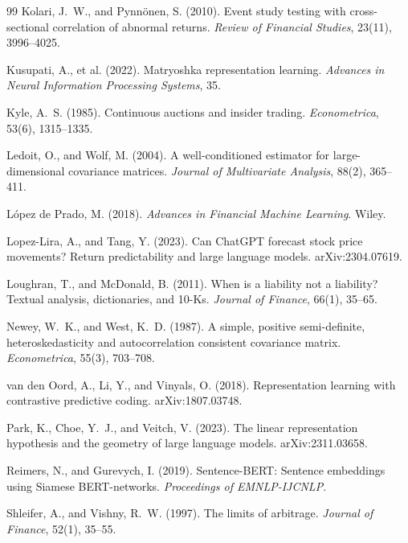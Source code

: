 \documentclass[11pt,a4paper]{article}
\theoremstyle{plain}
\theoremstyle{definition}
\begin{document}
\begin{thebibliography}{99}
Kolari, J.~W., and Pynn\"onen, S. (2010). Event study testing with cross-sectional correlation of abnormal returns. \emph{Review of Financial Studies}, 23(11), 3996--4025.

Kusupati, A., et al. (2022). Matryoshka representation learning. \emph{Advances in Neural Information Processing Systems}, 35.

Kyle, A.~S. (1985). Continuous auctions and insider trading. \emph{Econometrica}, 53(6), 1315--1335.

Ledoit, O., and Wolf, M. (2004). A well-conditioned estimator for large-dimensional covariance matrices. \emph{Journal of Multivariate Analysis}, 88(2), 365--411.

L\'opez de Prado, M. (2018). \emph{Advances in Financial Machine Learning}. Wiley.

Lopez-Lira, A., and Tang, Y. (2023). Can ChatGPT forecast stock price movements? Return predictability and large language models. arXiv:2304.07619.

Loughran, T., and McDonald, B. (2011). When is a liability not a liability? Textual analysis, dictionaries, and 10-Ks. \emph{Journal of Finance}, 66(1), 35--65.

Newey, W.~K., and West, K.~D. (1987). A simple, positive semi-definite, heteroskedasticity and autocorrelation consistent covariance matrix. \emph{Econometrica}, 55(3), 703--708.

van den Oord, A., Li, Y., and Vinyals, O. (2018). Representation learning with contrastive predictive coding. arXiv:1807.03748.

Park, K., Choe, Y.~J., and Veitch, V. (2023). The linear representation hypothesis and the geometry of large language models. arXiv:2311.03658.

Reimers, N., and Gurevych, I. (2019). Sentence-BERT: Sentence embeddings using Siamese BERT-networks. \emph{Proceedings of EMNLP-IJCNLP}.

Shleifer, A., and Vishny, R.~W. (1997). The limits of arbitrage. \emph{Journal of Finance}, 52(1), 35--55.


\end{thebibliography}
\end{document}
